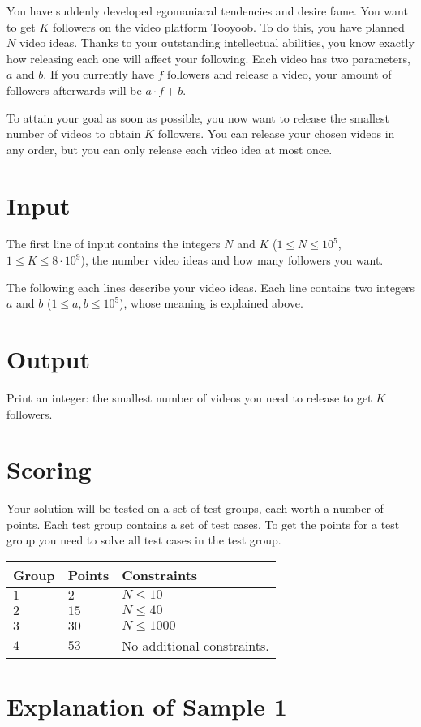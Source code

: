
\noindent
You have suddenly developed egomaniacal tendencies and desire fame. You want to get $K$ followers on the video platform
Tooyoob. To do this, you have planned $N$ video ideas. Thanks to your outstanding intellectual abilities, you know exactly
how releasing each one will affect your following. Each video has two parameters, $a$ and $b$. If you currently have $f$ followers
and release a video, your amount of followers afterwards will be $a \cdot f + b$. 

To attain your goal as soon as possible, you now want to release the smallest number of videos to obtain $K$ followers.
You can release your chosen videos in any order, but you can only release each video idea at most once.

\section*{Input}
The first line of input contains the integers $N$ and $K$ ($1 \le N \le 10^5$, $1 \leq K \leq 8 \cdot 10^9$), the number video ideas
and how many followers you want.

The following each lines describe your video ideas. Each line contains two integers $a$ and $b$ ($1 \leq a,b \leq 10^5$),
whose meaning is explained above.

\section*{Output}
Print an integer: the smallest number of videos you need to release to get $K$ followers.

\section*{Scoring}
Your solution will be tested on a set of test groups, each worth a number of points. Each test group contains
a set of test cases. To get the points for a test group you need to solve all test cases in the test group.

\noindent
\begin{tabular}{| l | l | p{12cm} |}
  \hline
  \textbf{Group} & \textbf{Points} & \textbf{Constraints} \\ \hline
  $1$    & $2$        & $N \leq 10$ \\ \hline
  $2$    & $15$       & $N \leq 40$ \\ \hline
  $3$    & $30$       & $N \leq 1000$ \\ \hline
  $4$    & $53$       & No additional constraints. \\ \hline
\end{tabular}

\section*{Explanation of Sample 1}
